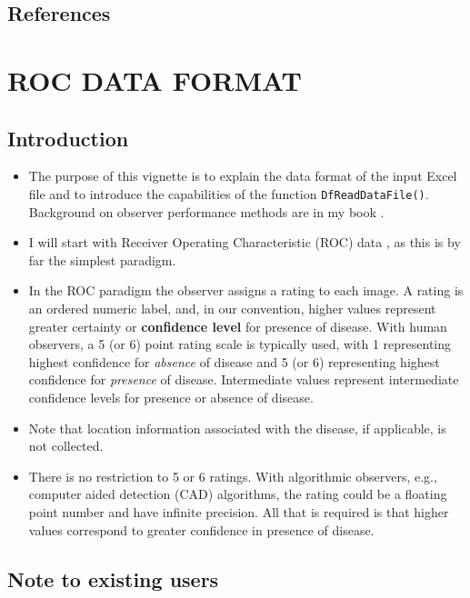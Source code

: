 \documentclass[]{book}
\providecommand{\tightlist}{%
  \setlength{\itemsep}{0pt}\setlength{\parskip}{0pt}}
\begin{document}
\hypertarget{references}{%
\section{References}\label{references}}

\hypertarget{rocdataformat}{%
\chapter{ROC DATA FORMAT}\label{rocdataformat}}

\hypertarget{introduction}{%
\section{Introduction}\label{introduction}}

\begin{itemize}
\tightlist
\item
  The purpose of this vignette is to explain the data format of the input Excel file and to introduce the capabilities of the function \texttt{DfReadDataFile()}. Background on observer performance methods are in my book \citep{RN2680}.
\item
  I will start with Receiver Operating Characteristic (ROC) data \citep{RN1766}, as this is by far the simplest paradigm.
\item
  In the ROC paradigm the observer assigns a rating to each image. A rating is an ordered numeric label, and, in our convention, higher values represent greater certainty or \textbf{confidence level} for presence of disease. With human observers, a 5 (or 6) point rating scale is typically used, with 1 representing highest confidence for \emph{absence} of disease and 5 (or 6) representing highest confidence for \emph{presence} of disease. Intermediate values represent intermediate confidence levels for presence or absence of disease.
\item
  Note that location information associated with the disease, if applicable, is not collected.
\item
  There is no restriction to 5 or 6 ratings. With algorithmic observers, e.g., computer aided detection (CAD) algorithms, the rating could be a floating point number and have infinite precision. All that is required is that higher values correspond to greater confidence in presence of disease.
\end{itemize}

\hypertarget{note-to-existing-users}{%
\section{Note to existing users}\label{note-to-existing-users}}
\end{document}
